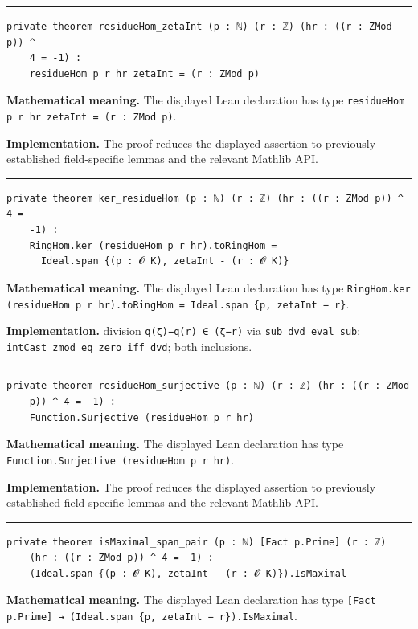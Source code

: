 \documentclass[UTF8,a4paper,11pt,fontset=fandol]{ctexart}
\theoremstyle{definition}
\newcommand{\statementsep}{\par\medskip\hrule\medskip}
\begin{document}
\statementsep
\begin{verbatim}
private theorem residueHom_zetaInt (p : ℕ) (r : ℤ) (hr : ((r : ZMod p)) ^
    4 = -1) :
    residueHom p r hr zetaInt = (r : ZMod p)
\end{verbatim}
\noindent\textbf{Mathematical meaning.} The displayed Lean declaration has type \texttt{residueHom p r hr zetaInt = (r : ZMod p)}.\par
\noindent\textbf{Implementation.} The proof reduces the displayed assertion to previously established field-specific lemmas and the relevant Mathlib API.\par
\statementsep
\begin{verbatim}
private theorem ker_residueHom (p : ℕ) (r : ℤ) (hr : ((r : ZMod p)) ^ 4 =
    -1) :
    RingHom.ker (residueHom p r hr).toRingHom =
      Ideal.span {(p : 𝓞 K), zetaInt - (r : 𝓞 K)}
\end{verbatim}
\noindent\textbf{Mathematical meaning.} The displayed Lean declaration has type \texttt{RingHom.\allowbreak{}ker (residueHom p r hr).\allowbreak{}toRingHom = Ideal.\allowbreak{}span \{p, zetaInt − r\}}.\par
\noindent\textbf{Implementation.} division \texttt{q(ζ)−q(r) ∈ (ζ−r)} via \texttt{sub\_\allowbreak{}dvd\_\allowbreak{}eval\_\allowbreak{}sub}; \texttt{intCast\_\allowbreak{}zmod\_\allowbreak{}eq\_\allowbreak{}zero\_\allowbreak{}iff\_\allowbreak{}dvd}; both inclusions.\par
\statementsep
\begin{verbatim}
private theorem residueHom_surjective (p : ℕ) (r : ℤ) (hr : ((r : ZMod
    p)) ^ 4 = -1) :
    Function.Surjective (residueHom p r hr)
\end{verbatim}
\noindent\textbf{Mathematical meaning.} The displayed Lean declaration has type \texttt{Function.\allowbreak{}Surjective (residueHom p r hr)}.\par
\noindent\textbf{Implementation.} The proof reduces the displayed assertion to previously established field-specific lemmas and the relevant Mathlib API.\par
\statementsep
\begin{verbatim}
private theorem isMaximal_span_pair (p : ℕ) [Fact p.Prime] (r : ℤ)
    (hr : ((r : ZMod p)) ^ 4 = -1) :
    (Ideal.span {(p : 𝓞 K), zetaInt - (r : 𝓞 K)}).IsMaximal
\end{verbatim}
\noindent\textbf{Mathematical meaning.} The displayed Lean declaration has type \texttt{[Fact p.\allowbreak{}Prime] → (Ideal.\allowbreak{}span \{p, zetaInt − r\}).\allowbreak{}IsMaximal}.\par
\end{document}

